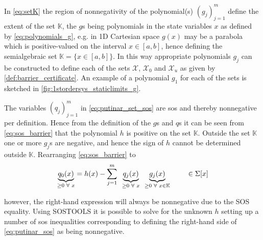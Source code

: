 In \autoref{eq:setK} the region of nonnegativity of the polynomial(s) $(g_j)_{j=1}^m$ define the extent of the set $\mathbb{K}$, the $g$s being  polynomials in the state variables $x$ as defined by \autoref{eq:polynomials_g}, e.g. in 1D Cartesian space $g(x)$ may be a parabola which is positive-valued on the interval $x\in[a,b]$, hence defining the semialgebraic set $\mathbb{K}=\{x\in[a,b]\}$. In this way appropriate polynomials $g_j$ can be constructed  to define each of the sets $\mathcal{X}$, $\mathcal{X}_0$ and $\mathcal{X}_u$ as given by \autoref{def:barrier_certificate}. An example of a polynomial $g_1$ for each of the sets is sketched in \autoref{fig:1stordersys_staticlimits_g}.

The variables $(q_j)_{j=1}^m$ in \autoref{eq:putinar_set_sos} are \gls{sos} and thereby nonnegative per definition. Hence from the definition of the $g$s and $q$s it can be seen from \autoref{eq:sos_barrier} that the polynomial $h$ is positive on the set $\mathbb{K}$.
Outside the set $\mathbb{K}$ one or more $g_j$s are negative, and hence the sign of $h$ cannot be determined outside $\mathbb{K}$.
Rearranging \autoref{eq:sos_barrier} to
\vspace{-2mm}
\begin{equation}
\underbrace{q_0(x)}_{\geq 0\,\,\forall \,\,x} = h(x) - \sum _{j=1}^{m}\,\,\,\underbrace{q_j(x)}_{\geq 0\,\,\forall \,\,x}\,\,\,\underbrace{g_j(x)}_{\geq 0 \,\,\forall \,\,x\in\mathbb{K}} \hspace{0.8cm} \in\Sigma[x]\label{eq:putinar_sos}
\end{equation} 

\vspace{-1mm}
however, the right-hand expression will always be nonnegative due to the SOS equality. Using SOSTOOLS  it is possible to solve for the unknown $h$ setting up a number of \gls{sos} inequalities corresponding to defining the right-hand side of \autoref{eq:putinar_sos} as being nonnegative. %

